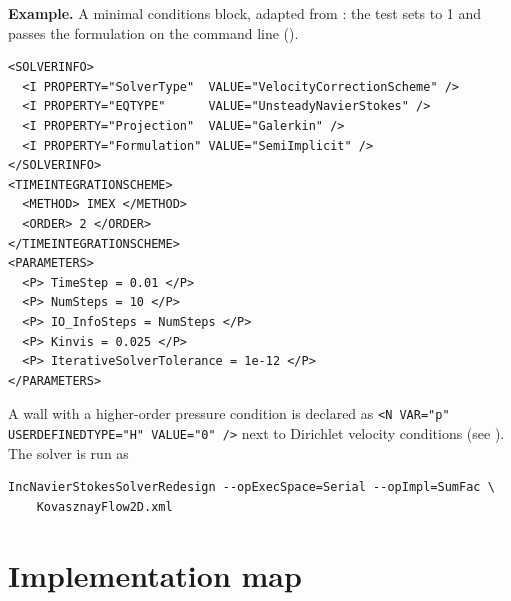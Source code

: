\textbf{Example.} A minimal conditions block, adapted from
: the test sets  to 1 and passes
the formulation on the command line ().

\begin{lstlisting}[style=XMLStyle]
<SOLVERINFO>
  <I PROPERTY="SolverType"  VALUE="VelocityCorrectionScheme" />
  <I PROPERTY="EQTYPE"      VALUE="UnsteadyNavierStokes" />
  <I PROPERTY="Projection"  VALUE="Galerkin" />
  <I PROPERTY="Formulation" VALUE="SemiImplicit" />
</SOLVERINFO>
<TIMEINTEGRATIONSCHEME>
  <METHOD> IMEX </METHOD>
  <ORDER> 2 </ORDER>
</TIMEINTEGRATIONSCHEME>
<PARAMETERS>
  <P> TimeStep = 0.01 </P>
  <P> NumSteps = 10 </P>
  <P> IO_InfoSteps = NumSteps </P>
  <P> Kinvis = 0.025 </P>
  <P> IterativeSolverTolerance = 1e-12 </P>
</PARAMETERS>
\end{lstlisting}

A wall with a higher-order pressure condition is declared as
\lstinline[style=XMLStyle]!<N VAR="p" USERDEFINEDTYPE="H" VALUE="0" />!
next to Dirichlet velocity conditions (see
). The solver is run as
\begin{lstlisting}[style=BashInputStyle]
IncNavierStokesSolverRedesign --opExecSpace=Serial --opImpl=SumFac \
    KovasznayFlow2D.xml
\end{lstlisting}

\section{Implementation map}
\label{sec:incns-map}

